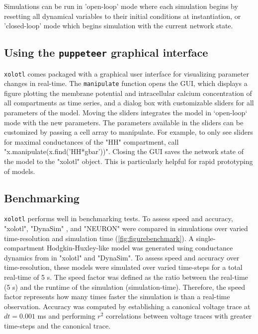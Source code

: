 \documentclass{frontiersSCNS} %
\begin{document}
Simulations can be run in 'open-loop' mode where each simulation begins by resetting all dynamical variables to their initial conditions at instantiation, or 'closed-loop' mode which begins simulation with the current network state.

\subsection{Using the \texttt{puppeteer} graphical interface}

\texttt{xolotl} comes packaged with a graphical user interface for visualizing parameter changes in real-time. The \texttt{manipulate} function opens the GUI, which displays a figure plotting the membrane potential and intracellular calcium concentration of all compartments as time series, and a dialog box with customizable sliders for all parameters of the model. Moving the sliders integrates the model in `open-loop` mode with the new parameters. The parameters available in the sliders can be customized by passing a cell array to manipulate. For example, to only see sliders for maximal conductances of the "HH" compartment, call "x.manipulate(x.find('HH*gbar'))". Closing the GUI saves the network state of the model to the "xolotl" object. This is particularly helpful for rapid prototyping of models.

\subsection{Benchmarking}

\texttt{xolotl} performs well in benchmarking tests. To assess speed and accuracy, "xolotl", "DynaSim" \autocite{sherfeyDynaSimMATLABToolbox2018}, and "NEURON" \autocite{hinesNEURONSimulationEnvironment1997} were compared in simulations over varied time-resolution and simulation time (\ref{fig:figurebenchmark}). A single-compartment Hodgkin-Huxley-like model was generated using conductance dynamics from \cite{liuModelNeuronActivitydependent1998} in "xolotl" and "DynaSim". To assess speed and accuracy over time-resolution, these models were simulated over varied time-steps for a total real-time of 5 s. The speed factor was defined as the ratio between the real-time (5 s) and the runtime of the simulation (simulation-time). Therefore, the speed factor represents how many times faster the simulation is than a real-time observation. Accuracy was computed by establishing a canonical voltage trace at $dt = 0.001$ ms and performing $r^2$ correlations between voltage traces with greater time-steps and the canonical trace.
\end{document}

